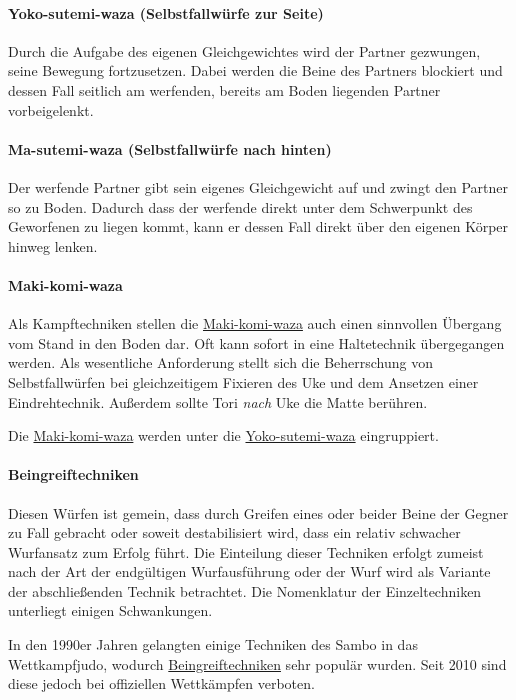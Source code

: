 \documentclass[justified, a4paper, notitlepage, captions=tableheading, nobib]{tufte-handout}
\begin{document}
\paragraph{\label{orgeedc698}Yoko-sutemi-waza (Selbstfallwürfe zur Seite) }
\label{sec:org0403b74}
Durch die Aufgabe des eigenen Gleichgewichtes wird der Partner gezwungen, seine Bewegung fortzusetzen. Dabei werden die Beine des Partners blockiert und dessen Fall seitlich am werfenden, bereits am Boden liegenden Partner vorbeigelenkt. 

\paragraph{\label{org2b26d8f}Ma-sutemi-waza (Selbstfallwürfe nach hinten) }
\label{sec:org80117a9}
Der werfende Partner gibt sein eigenes Gleichgewicht auf und zwingt den Partner so zu Boden. Dadurch dass der werfende direkt unter dem Schwerpunkt des Geworfenen zu liegen kommt, kann er dessen Fall direkt über den eigenen Körper hinweg lenken.

\paragraph{\label{org47fbcfd}Maki-komi-waza }
\label{sec:orgd80051e}
Als Kampftechniken stellen die \hyperref[org47fbcfd]{Maki-komi-waza} auch einen sinnvollen Übergang vom Stand in den Boden dar. Oft kann sofort in eine Haltetechnik übergegangen werden. Als wesentliche Anforderung stellt sich die Beherrschung von Selbstfallwürfen bei gleichzeitigem Fixieren des Uke und dem Ansetzen einer Eindrehtechnik. Außerdem sollte Tori \emph{nach} Uke die Matte berühren.

Die \hyperref[org47fbcfd]{Maki-komi-waza} werden unter die \hyperref[orgeedc698]{Yoko-sutemi-waza} eingruppiert. 

\paragraph{\label{orge6f63f9}Beingreiftechniken }
\label{sec:org1d6a834}
Diesen Würfen ist gemein, dass durch Greifen eines oder beider Beine der Gegner zu Fall gebracht oder soweit destabilisiert wird, dass ein relativ schwacher Wurfansatz zum Erfolg führt. Die Einteilung dieser Techniken erfolgt zumeist nach der Art der endgültigen Wurfausführung oder der Wurf wird als Variante der abschließenden Technik betrachtet. Die Nomenklatur der Einzeltechniken unterliegt einigen Schwankungen.

In den 1990er Jahren gelangten einige Techniken des Sambo in das Wettkampfjudo, wodurch \hyperref[orge6f63f9]{Beingreiftechniken} sehr populär wurden. Seit 2010 sind diese jedoch bei offiziellen Wettkämpfen verboten.
\end{document}
